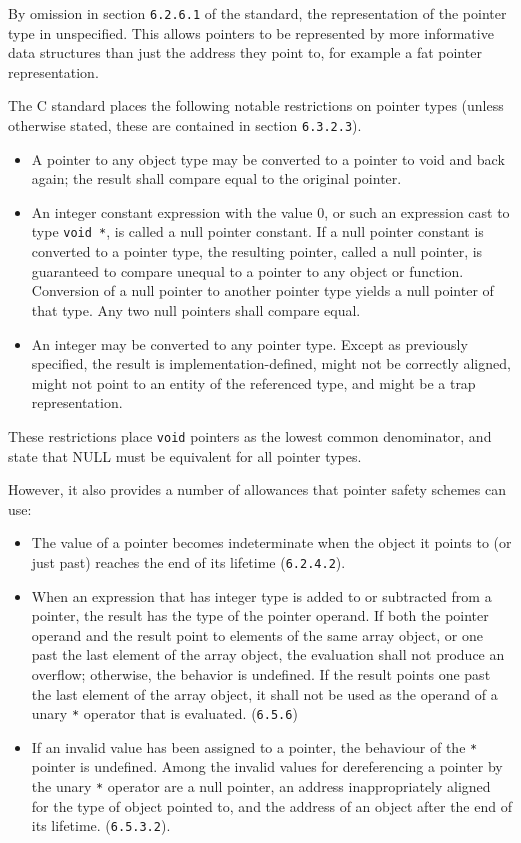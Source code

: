 By omission in section \verb!6.2.6.1! of the standard, the representation of the pointer type in unspecified.
This allows pointers to be represented by more informative data structures than just the address they point to, for example a fat pointer representation.

The C standard places the following notable restrictions on pointer types (unless otherwise stated, these are contained in section \verb!6.3.2.3!).

\begin{itemize}
\item A pointer to any object type may be converted to a pointer to void and back again; the result shall compare equal to the original pointer.
\item An integer constant expression with the value 0, or such an expression cast to type \verb!void *!, is called a null pointer constant.  
If a null pointer constant is converted to a pointer type, the resulting pointer, called a null pointer, is guaranteed to compare unequal to a pointer to any object or function.
Conversion of a null pointer to another pointer type yields a null pointer of that type.  
Any two null pointers shall compare equal.
\item An integer may be converted to any pointer type.
Except as previously specified, the result is implementation-defined, might not be correctly aligned, might not point to an entity of the referenced type, and might be a trap representation.
\end{itemize}

These restrictions place \verb!void! pointers as the lowest common denominator, and state that NULL must be equivalent for all pointer types.

However, it also provides a number of allowances that pointer safety schemes can use:

\begin{itemize}
\item The value of a pointer becomes indeterminate when the object it points to (or just past) reaches the end of its lifetime (\verb!6.2.4.2!).
\item When an expression that has integer type is added to or subtracted from a pointer, the result has the type of the pointer operand.
If both the pointer operand and the result point to elements of the same array object, or one past the last element of the array object, the evaluation shall not produce an overflow; otherwise, the behavior is undefined.
If the result points one past the last element of the array object, it shall not be used as the operand of a unary \verb!*! operator that is evaluated. (\verb!6.5.6!)
\item If an invalid value has been assigned to a pointer, the behaviour of the \verb!*! pointer is undefined.
Among the invalid values for dereferencing a pointer by the unary \verb!*! operator are a null pointer, an address inappropriately aligned for the type of object pointed to, and the address of an object after the end of its lifetime. (\verb!6.5.3.2!).
\end{itemize}

